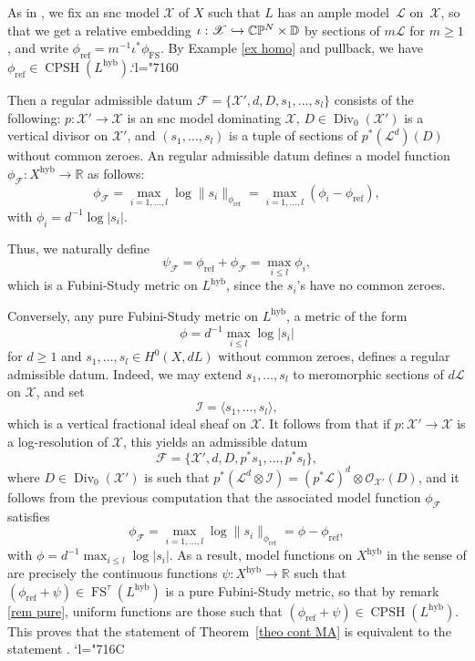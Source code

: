 \documentclass[JEP,XML,SOM,Unicode,published]{cedram}
\newcommand{\Changel}{\mathcode`l="7160}
\newcommand{\Changelback}{\mathcode`l="716C}
\newcommand\hto{\mathrel{\lhook\joinrel\to}}
\theoremstyle{definition}
\newcommand \C{\mathbb C}
\newcommand \D {\mathbb{D}}
\newcommand \CP {\mathbb P}
\newcommand \R{\mathbb R}
\newcommand \gO {\mathcal O}
\newcommand \Ld {\mathscr {L}}
\newcommand \X {\mathscr{X}}
\DeclareMathOperator{\CPSH}{CPSH}
\DeclareMathOperator \Div {Div}
\DeclareMathOperator{\FS}{FS}
\newcommand{\hyb}{\mathrm{hyb}}
\DeclareMathOperator{\rf}{ref}
\begin{document}
As in \cite{Fav}, we fix an snc model $\X$ of $X$ such that $L$ has an ample model~$\Ld$ on~$\X$, so that we get a relative embedding $\iota: \X \hto \C \CP^N \times \D$ by sections of $m\Ld$ for $m \ge 1$, and write $\phi_{\rf} = m^{-1} \iota^* \phi_{\FS}$. By Example \ref{ex homo} and pullback, we have $\phi_{\rf} \in \CPSH(L^{\hyb})$.\Changel

Then a regular admissible datum $\mathcal{F} = \{ \X', d, D, s_1,\dots, s_l \}$ consists of the following: $p: \X' \to \X$ is an snc model dominating $\X$, $D \in \Div_0(\X')$ is a vertical divisor on $\X'$, and $(s_1,\dots,s_l)$ is a tuple of sections of $p^*(\Ld^d)(D)$ without common zeroes.
An regular admissible datum defines a model function $\phi_{\mathcal{F}}: X^{\hyb} \to \R$ as follows:
\[
\phi_{\mathcal{F}} = \max_{i=1,\dots,l} \log \lVert s_i \rVert_{\phi_{\rf}} = \max_{i=1,\dots,l} (\phi_i - \phi_{\rf}),
\]
with $\phi_i = d^{-1} \log \lvert s_i \rvert$.

Thus, we naturally define
\[
\psi_{\mathcal{F}}=\phi_{\rf} + \phi_{\mathcal{F}} = \max_{i \le l} \phi_i,
\]
which is a Fubini-Study metric on $L^{\hyb}$, since the $s_i$'s have no common zeroes.

Conversely, any pure Fubini-Study metric on $L^{\hyb}$, \ie a metric of the form
\[
\phi = d^{-1} \max_{i \le l} \log \lvert s_i \rvert
\]
for $d \ge 1$ and $s_1,\dots,s_l \in H^0(X, dL)$ without common zeroes, defines a regular admissible datum. Indeed, we may extend $s_1,\dots,s_l$ to meromorphic sections of $d\Ld$ on $\X$, and set
\[
\mathscr{I} = \langle s_1,\dots, s_l \rangle,
\]
which is a vertical fractional ideal sheaf on $\X$. It follows from \cite[Prop.\,2.2]{Fav} that if $p: \X' \to \X$ is a log-resolution of $\X$, this yields an admissible datum\vspace*{-3pt}
\[
\mathcal{F} = \{ \X', d , D, p^*s_1,\dots,p^*s_l \},
\]
where $D \in \Div_0(\X')$ is such that $p^*(\Ld^d \otimes \mathscr{I}) = (p^*\Ld)^d \otimes \gO_{\X'}(D)$, and it follows from the previous computation that the associated model function $\phi_{\mathcal{F}}$ satisfies\vspace*{-3pt}
\[
\phi_{\mathcal{F}} = \max_{i=1,\dots,l} \log \lVert s_i \rVert_{\phi_{\rf}} = \phi -\phi_{\rf},
\]
with $\phi = d^{-1} \max_{i \le l} \log \lvert s_i \rvert$. As a result, model functions on $X^{\hyb}$ in the sense of \cite{Fav} are precisely the continuous functions $\psi: X^{\hyb} \to \R$ such that $(\phi_{\rf} + \psi) \in \FS^{\tau}(L^{\hyb})$ is a pure Fubini-Study metric, so that by remark \ref{rem pure}, uniform functions are those such that $(\phi_{\rf} + \psi) \in \CPSH(L^{\hyb})$. This proves that the statement of Theorem~\ref{theo cont MA} is equivalent to the statement \cite[Th.\,4.2]{Fav}.
\Changelback
\end{document}
